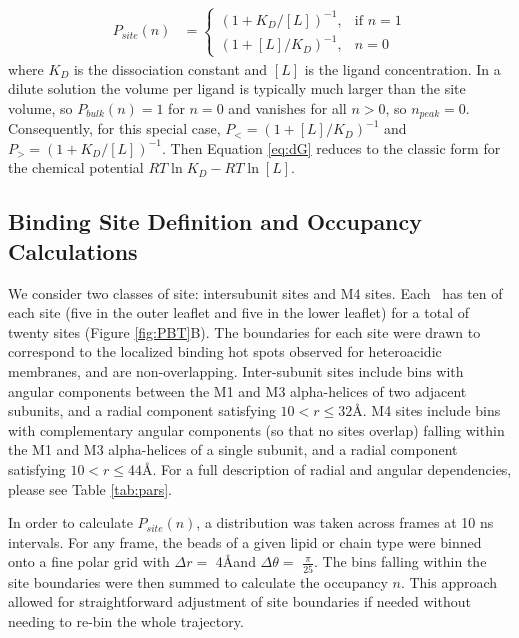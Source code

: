 \begin{eqnarray}
P_{site}(n)&= 
\begin{cases}
    (1+ K_{D}/[L])^{-1},& \text{if } n = 1\\
    (1+ [L]/K_{D})^{-1},& n=0
\end{cases}
\end{eqnarray}
where $K_{D}$ is the dissociation constant and $[L]$ is the ligand concentration. In a dilute solution the volume per ligand is typically much larger than the site volume, so $P_{bulk} (n)=1$ for $n=0$ and vanishes for all $n>0$, so $n_{peak} = 0$. Consequently, for this special case, $P_{<} = (1+ [L]/K_{D})^{-1}$ and $P_{>} = (1+ K_{D}/[L])^{-1}$. 
Then Equation \ref{eq:dG} reduces to the classic form for the chemical potential $RT\ln K_{D}-  RT\ln [L]$. 

\subsection{Binding Site Definition and Occupancy Calculations}

We consider two classes of site: intersubunit sites and M4 sites. Each \plgic~has ten of each site (five in the outer leaflet and five in the lower leaflet) for a total of twenty sites (Figure \ref{fig:PBT}B).  The boundaries for each site were drawn to correspond to the localized binding hot spots observed for heteroacidic membranes\cite{Woods2019}, and are non-overlapping. Inter-subunit sites include bins with angular components between the M1 and M3 alpha-helices of two adjacent subunits, and a radial component satisfying $10<r\leq32$\AA.  M4 sites include bins with complementary angular components (so that no sites overlap) falling within the M1 and M3 alpha-helices of a single subunit, and a radial component satisfying $10<r\leq44$\AA. For a full description of radial and angular dependencies, please see Table \ref{tab:pars}. 

In order to calculate $P_{site}(n)$, a distribution was taken across frames at 10 ns intervals. For any frame, the  beads of a given lipid or chain type were binned onto a fine polar grid with $\Delta r=$  4\AA and $\Delta \theta=$ $\frac{\pi}{25}$. The bins falling within the site boundaries were then summed to calculate the occupancy $n$.  This approach allowed for straightforward adjustment of site boundaries if needed without needing to re-bin the whole trajectory.  %

